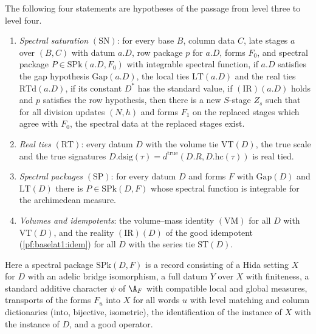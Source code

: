\begin{definition}\label{pf:baselat1:def:satnew}
The following four statements are hypotheses of the passage from level three to level four.
\begin{enumerate}[label=(\alph*)]
\item \emph{Spectral saturation} $(\mathrm{SN})$: for every base $B$, column data $C$, late stages $a$ over
  $(B,C)$ with datum $a.D$, row package $p$ for $a.D$, forms $F_0$, and spectral package
  $P\in\mathrm{SPk}(a.D,F_0)$ with integrable spectral function, if $a.D$ satisfies the gap hypothesis
  $\mathrm{Gap}(a.D)$, the local ties $\mathrm{LT}(a.D)$ and the real ties $\mathrm{RTd}(a.D)$, if its constant
  $D^*$ has the standard value, if $(\mathrm{IR})(a.D)$ holds and $p$ satisfies the row hypothesis, then there is
  a new $S$-stage $Z_s$ such that for all division updates $(N,h)$ and forms $F_1$ on the replaced stages
  which agree with $F_0$, the spectral data at the replaced stages exist.
\item \emph{Real ties} $(\mathrm{RT})$: every datum $D$ with the volume tie $\mathrm{VT}(D)$, the true scale and
  the true signatures $D.\mathrm{dsig}(\tau)=d^{\mathrm{true}}(D.R,D.\mathrm{hc}(\tau))$ is real tied.
\item \emph{Spectral packages} $(\mathrm{SP})$: for every datum $D$ and forms $F$ with $\mathrm{Gap}(D)$ and
  $\mathrm{LT}(D)$ there is $P\in\mathrm{SPk}(D,F)$ whose spectral function is integrable for the archimedean
  measure.
\item \emph{Volumes and idempotents}: the volume--mass identity $(\mathrm{VM})$ for all $D$ with $\mathrm{VT}(D)$,
  and the reality $(\mathrm{IR})(D)$ of the good idempotent (\cref{pf:baselat1:idem}) for all $D$ with the series
  tie $\mathrm{ST}(D)$.
\end{enumerate}
Here a spectral package $\mathrm{SPk}(D,F)$ is a record consisting of a Hida setting $X$ for $D$ with an adelic
bridge isomorphism, a full datum $Y$ over $X$ with finiteness, a standard additive character $\psi$ of $\A_F$ with
compatible local and global measures, transports of the forms $F_u$ into $X$ for all words $u$ with level
matching and column dictionaries (into, bijective, isometric), the identification of the instance of $X$ with
the instance of $D$, and a good operator.
%
\end{definition}

